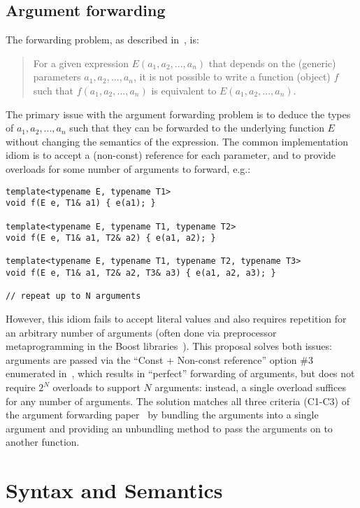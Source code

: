 \documentclass{article}
\begin{document}
\subsection{Argument forwarding}
The forwarding problem, as described in~\cite{Dimov02}, is:

\begin{quote}
  For a given expression $E(a_1, a_2, ..., a_n)$ that depends on the
  (generic) parameters $a_1, a_2, ..., a_n$, it is not possible to
  write a function (object) $f$ such that $f(a_1, a_2, ..., a_n)$ is
  equivalent to $E(a_1, a_2, ..., a_n)$.
\end{quote}

The primary issue with the argument forwarding problem is to deduce
the types of $a_1, a_2, ..., a_n$ such that they can be forwarded to
the underlying function $E$ without changing the semantics of the
expression. The common implementation idiom is to accept a (non-const)
reference for each parameter, and to provide overloads for some number
of arguments to forward, e.g.:
\begin{verbatim}
template<typename E, typename T1>
void f(E e, T1& a1) { e(a1); }

template<typename E, typename T1, typename T2>
void f(E e, T1& a1, T2& a2) { e(a1, a2); }

template<typename E, typename T1, typename T2, typename T3>
void f(E e, T1& a1, T2& a2, T3& a3) { e(a1, a2, a3); }

// repeat up to N arguments
\end{verbatim}

However, this idiom fails to accept literal values and also requires
repetition for an arbitrary number of arguments (often done via
preprocessor metaprogramming in the Boost
libraries~\cite{Preprocessor01}). This proposal solves both issues:
arguments are passed via the ``Const + Non-const reference'' option
\#3 enumerated in~\cite{Dimov02}, which results in ``perfect''
forwarding of arguments, but does not require $2^N$ overloads to
support $N$ arguments: instead, a single overload suffices for any
number of arguments. The solution matches all three criteria (C1-C3)
of the argument forwarding paper~\cite{Dimov02} by bundling the
arguments into a single argument and providing an unbundling method to
pass the arguments on to another function.

\section{Syntax and Semantics}
\end{document}
